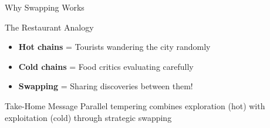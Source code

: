 \documentclass[aspectratio=169]{beamer}
\begin{document}
\begin{frame}{Why Swapping Works}
	\begin{block}{The Restaurant Analogy}
		\begin{itemize}
			\item \textbf{Hot chains} = Tourists wandering the city randomly
			\item \textbf{Cold chains} = Food critics evaluating carefully
			\item \textbf{Swapping} = Sharing discoveries between them!
		\end{itemize}
	\end{block}

	\begin{alertblock}{Take-Home Message}
		Parallel tempering combines exploration (hot) with exploitation (cold) through strategic swapping
	\end{alertblock}

\end{frame}



\end{document}
